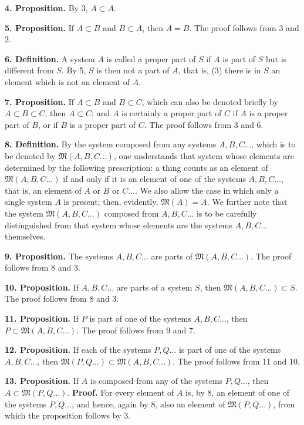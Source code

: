 \documentclass[11pt]{article}
\newcommand{\Mf}{\mathfrak{M}}
\newcommand{\partof}{\mathrel{\subset}}
\begin{document}
\noindent\textbf{4. Proposition.} By 3, $A\partof A$.

\noindent\textbf{5. Proposition.} If $A\partof B$ and $B\partof A$, then $A=B$. The proof follows from 3 and 2.

\noindent\textbf{6. Definition.} A system $A$ is called a proper part of $S$ if $A$ is part of $S$ but is different from $S$. By 5, $S$ is then not a part of $A$, that is, (3) there is in $S$ an element which is not an element of $A$.

\noindent\textbf{7. Proposition.} If $A\partof B$ and $B\partof C$, which can also be denoted briefly by $A\partof B\partof C$, then $A\partof C$; and $A$ is certainly a proper part of $C$ if $A$ is a proper part of $B$, or if $B$ is a proper part of $C$. The proof follows from 3 and 6.

\noindent\textbf{8. Definition.} By the system composed from any systems $A,B,C\ldots$, which is to be denoted by $\Mf(A,B,C\ldots)$, one understands that system whose elements are determined by the following prescription: a thing counts as an element of $\Mf(A,B,C\ldots)$ if and only if it is an element of one of the systems $A,B,C\ldots$, that is, an element of $A$ or $B$ or $C\ldots$. We also allow the case in which only a single system $A$ is present; then, evidently, $\Mf(A)=A$. We further note that the system $\Mf(A,B,C\ldots)$ composed from $A,B,C\ldots$ is to be carefully distinguished from that system whose elements are the systems $A,B,C\ldots$ themselves.

\noindent\textbf{9. Proposition.} The systems $A,B,C\ldots$ are parts of $\Mf(A,B,C\ldots)$. The proof follows from 8 and 3.

\noindent\textbf{10. Proposition.} If $A,B,C\ldots$ are parts of a system $S$, then $\Mf(A,B,C\ldots)\partof S$. The proof follows from 8 and 3.

\noindent\textbf{11. Proposition.} If $P$ is part of one of the systems $A,B,C\ldots$, then $P\partof\Mf(A,B,C\ldots)$. The proof follows from 9 and 7.

\noindent\textbf{12. Proposition.} If each of the systems $P,Q\ldots$ is part of one of the systems $A,B,C\ldots$, then $\Mf(P,Q\ldots)\partof\Mf(A,B,C\ldots)$. The proof follows from 11 and 10.

\noindent\textbf{13. Proposition.} If $A$ is composed from any of the systems $P,Q\ldots$, then $A\partof\Mf(P,Q\ldots)$. \textbf{Proof.} For every element of $A$ is, by 8, an element of one of the systems $P,Q\ldots$, and hence, again by 8, also an element of $\Mf(P,Q\ldots)$, from which the proposition follows by 3.
\end{document}
